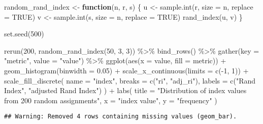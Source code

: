 \documentclass[
]{book}
\newenvironment{Shaded}{\begin{snugshade}}{\end{snugshade}}
\newcommand{\AttributeTok}[1]{\textcolor[rgb]{0.77,0.63,0.00}{#1}}
\newcommand{\ConstantTok}[1]{\textcolor[rgb]{0.00,0.00,0.00}{#1}}
\newcommand{\ControlFlowTok}[1]{\textcolor[rgb]{0.13,0.29,0.53}{\textbf{#1}}}
\newcommand{\DecValTok}[1]{\textcolor[rgb]{0.00,0.00,0.81}{#1}}
\newcommand{\FloatTok}[1]{\textcolor[rgb]{0.00,0.00,0.81}{#1}}
\newcommand{\FunctionTok}[1]{\textcolor[rgb]{0.00,0.00,0.00}{#1}}
\newcommand{\NormalTok}[1]{#1}
\newcommand{\OtherTok}[1]{\textcolor[rgb]{0.56,0.35,0.01}{#1}}
\newcommand{\SpecialCharTok}[1]{\textcolor[rgb]{0.00,0.00,0.00}{#1}}
\newcommand{\StringTok}[1]{\textcolor[rgb]{0.31,0.60,0.02}{#1}}
\begin{document}
\begin{Shaded}
\begin{Highlighting}[]
\NormalTok{random\_rand\_index }\OtherTok{\textless{}{-}} \ControlFlowTok{function}\NormalTok{(n, r, s) \{}
\NormalTok{  u }\OtherTok{\textless{}{-}} \FunctionTok{sample.int}\NormalTok{(r, }\AttributeTok{size =}\NormalTok{ n, }\AttributeTok{replace =} \ConstantTok{TRUE}\NormalTok{)}
\NormalTok{  v }\OtherTok{\textless{}{-}} \FunctionTok{sample.int}\NormalTok{(s, }\AttributeTok{size =}\NormalTok{ n, }\AttributeTok{replace =} \ConstantTok{TRUE}\NormalTok{)}
  \FunctionTok{rand\_index}\NormalTok{(u, v)}
\NormalTok{\}}

\FunctionTok{set.seed}\NormalTok{(}\DecValTok{500}\NormalTok{)}

\FunctionTok{rerun}\NormalTok{(}\DecValTok{200}\NormalTok{, }\FunctionTok{random\_rand\_index}\NormalTok{(}\DecValTok{50}\NormalTok{, }\DecValTok{3}\NormalTok{, }\DecValTok{3}\NormalTok{)) }\SpecialCharTok{\%\textgreater{}\%}
  \FunctionTok{bind\_rows}\NormalTok{() }\SpecialCharTok{\%\textgreater{}\%}
  \FunctionTok{gather}\NormalTok{(}\AttributeTok{key =} \StringTok{"metric"}\NormalTok{, }\AttributeTok{value =} \StringTok{"value"}\NormalTok{) }\SpecialCharTok{\%\textgreater{}\%}
  \FunctionTok{ggplot}\NormalTok{(}\FunctionTok{aes}\NormalTok{(}\AttributeTok{x =}\NormalTok{ value, }\AttributeTok{fill =}\NormalTok{ metric)) }\SpecialCharTok{+}
  \FunctionTok{geom\_histogram}\NormalTok{(}\AttributeTok{binwidth =} \FloatTok{0.05}\NormalTok{) }\SpecialCharTok{+}
  \FunctionTok{scale\_x\_continuous}\NormalTok{(}\AttributeTok{limits =} \FunctionTok{c}\NormalTok{(}\SpecialCharTok{{-}}\DecValTok{1}\NormalTok{, }\DecValTok{1}\NormalTok{)) }\SpecialCharTok{+}
  \FunctionTok{scale\_fill\_discrete}\NormalTok{(}
    \AttributeTok{name =} \StringTok{"index"}\NormalTok{,}
    \AttributeTok{breaks =} \FunctionTok{c}\NormalTok{(}\StringTok{"ri"}\NormalTok{, }\StringTok{"adj\_ri"}\NormalTok{),}
    \AttributeTok{labels =} \FunctionTok{c}\NormalTok{(}\StringTok{"Rand Index"}\NormalTok{, }\StringTok{"adjusted Rand Index"}\NormalTok{)}
\NormalTok{  ) }\SpecialCharTok{+}
  \FunctionTok{labs}\NormalTok{(}
    \AttributeTok{title =} \StringTok{"Distribution of index values from 200 random assignments"}\NormalTok{,}
    \AttributeTok{x =} \StringTok{"index value"}\NormalTok{,}
    \AttributeTok{y =} \StringTok{"frequency"}
\NormalTok{  )}
\end{Highlighting}
\end{Shaded}

\begin{verbatim}
## Warning: Removed 4 rows containing missing values (geom_bar).
\end{verbatim}
\end{document}
